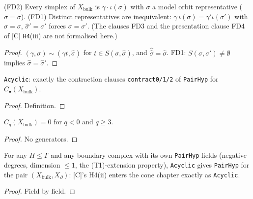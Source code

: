 \begin{proposition}\label{prop:model7h4-iii}
  \leanok
  (FD2) Every simplex of $X_{\mathrm{bulk}}$ is $\gamma\cdot\iota(\sigma)$ with $\sigma$ a model orbit representative
  ($\hat\sigma=\sigma$). (FD1) Distinct representatives are inequivalent: $\gamma\,\iota(\sigma)=\gamma'\iota(\sigma')$ with
  $\hat\sigma=\sigma$, $\hat\sigma'=\sigma'$ forces $\sigma=\sigma'$. (The clauses FD3 and the presentation clause FD4 of [C]
  \texttt{H4}(iii) are not formalised here.)
\end{proposition}
\begin{proof}
  \leanok
  $(\gamma,\sigma)\sim(\gamma t,\hat\sigma)$ for $t\in S(\sigma,\hat\sigma)$, and $\hat{\hat\sigma}=\hat\sigma$. FD1: $S(\sigma,\sigma')\neq\emptyset$
  implies $\hat\sigma=\hat\sigma'$.
\end{proof}

\begin{definition}\label{def:xbulk-acyclic}
  \leanok
  \texttt{Acyclic}: exactly the contraction clauses \texttt{contract0/1/2} of \texttt{PairHyp} for $C_\bullet(X_{\mathrm{bulk}})$.
\end{definition}
\begin{proof}
  \leanok
  Definition.
\end{proof}

\begin{lemma}\label{prop:model7h4-ii-dim}
  \leanok
  $C_q(X_{\mathrm{bulk}})=0$ for $q<0$ and $q\ge3$.
\end{lemma}
\begin{proof}
  \leanok
  No generators.
\end{proof}

\begin{theorem}\label{thm:pairhyp-of-acyclic}
  \leanok
  For any $H\le\Gamma$ and any boundary complex with its own \texttt{PairHyp} fields (negative degrees, dimension $\le1$, the
  (T1)-extension property), \texttt{Acyclic} gives \texttt{PairHyp} for the pair $(X_{\mathrm{bulk}},X_\partial)$: [C]'s
  H4(ii) enters the cone chapter exactly as \texttt{Acyclic}.
\end{theorem}
\begin{proof}
  \leanok
  Field by field.
\end{proof}

